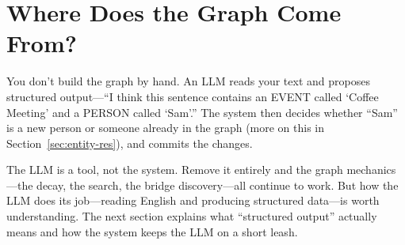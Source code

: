 \documentclass[11pt, letterpaper]{article}
\begin{document}
\section{Where Does the Graph Come From?}

You don't build the graph by hand. An LLM reads your text and proposes structured output---``I think this sentence contains an EVENT called `Coffee Meeting' and a PERSON called `Sam'.'' The system then decides whether ``Sam'' is a new person or someone already in the graph (more on this in Section~\ref{sec:entity-res}), and commits the changes.

\begin{center}
\end{center}

The LLM is a tool, not the system. Remove it entirely and the graph mechanics---the decay, the search, the bridge discovery---all continue to work. But how the LLM does its job---reading English and producing structured data---is worth understanding. The next section explains what ``structured output'' actually means and how the system keeps the LLM on a short leash.
\end{document}
